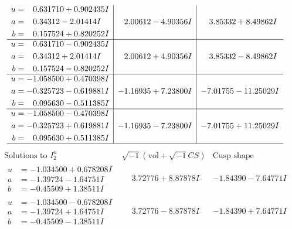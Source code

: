 \documentclass[1p]{elsarticle_modified}
\theoremstyle{definition}
\newcommand{\I}{\sqrt{-1}}
\begin{document}
$$\begin{array}{c|c|c}
\begin{aligned}
u &= \phantom{-}0.631710 + 0.902435 I \\
a &= \phantom{-}0.34312 - 2.01414 I \\
b &= \phantom{-}0.157524 + 0.820252 I\end{aligned}
 & \phantom{-}2.00612 - 4.90356 I & \phantom{-}3.85332 + 8.49862 I \\ \hline\begin{aligned}
u &= \phantom{-}0.631710 - 0.902435 I \\
a &= \phantom{-}0.34312 + 2.01414 I \\
b &= \phantom{-}0.157524 - 0.820252 I\end{aligned}
 & \phantom{-}2.00612 + 4.90356 I & \phantom{-}3.85332 - 8.49862 I \\ \hline\begin{aligned}
u &= -1.058500 + 0.470398 I \\
a &= -0.325723 - 0.619881 I \\
b &= \phantom{-}0.095630 - 0.511385 I\end{aligned}
 & -1.16935 + 7.23800 I & -7.01755 - 11.25029 I \\ \hline\begin{aligned}
u &= -1.058500 - 0.470398 I \\
a &= -0.325723 + 0.619881 I \\
b &= \phantom{-}0.095630 + 0.511385 I\end{aligned}
 & -1.16935 - 7.23800 I & -7.01755 + 11.25029 I\\
 \hline 
 \end{array}$$\newpage$$\begin{array}{c|c|c}  
\text{Solutions to }I^u_{2}& \I (\text{vol} + \sqrt{-1}CS) & \text{Cusp shape}\\
 \hline 
\begin{aligned}
u &= -1.034500 + 0.678208 I \\
a &= -1.39724 - 1.64751 I \\
b &= -0.45509 + 1.38511 I\end{aligned}
 & \phantom{-}3.72776 + 8.87878 I & -1.84390 - 7.64771 I \\ \hline\begin{aligned}
u &= -1.034500 - 0.678208 I \\
a &= -1.39724 + 1.64751 I \\
b &= -0.45509 - 1.38511 I\end{aligned}
 & \phantom{-}3.72776 - 8.87878 I & -1.84390 + 7.64771 I \\ \hline\begin{aligned}

\end{aligned}
\end{array}$$
\end{document}
